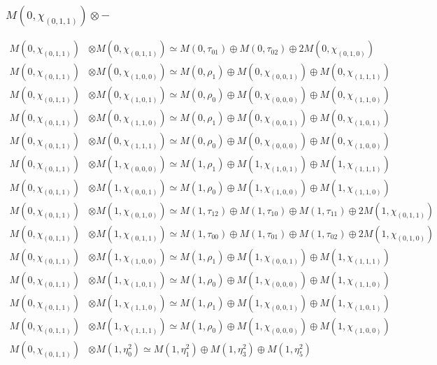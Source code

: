 \subsubsection{$ M(0,\chi_{(0,1,1)})\otimes -$}
\begin{align*}
M(0,\chi_{(0,1,1)}) &\otimes M(0,\chi_{(0,1,1)}) \simeq M(0,\tau_{01}) \oplus M(0,\tau_{02}) \oplus 2 M(0,\chi_{(0,1,0)}) \\
M(0,\chi_{(0,1,1)}) &\otimes M(0,\chi_{(1,0,0)}) \simeq M(0,\rho_{1}) \oplus M(0,\chi_{(0,0,1)}) \oplus M(0,\chi_{(1,1,1)}) \\
M(0,\chi_{(0,1,1)}) &\otimes M(0,\chi_{(1,0,1)}) \simeq M(0,\rho_{0}) \oplus M(0,\chi_{(0,0,0)}) \oplus M(0,\chi_{(1,1,0)}) \\
M(0,\chi_{(0,1,1)}) &\otimes M(0,\chi_{(1,1,0)}) \simeq M(0,\rho_{1}) \oplus M(0,\chi_{(0,0,1)}) \oplus M(0,\chi_{(1,0,1)}) \\
M(0,\chi_{(0,1,1)}) &\otimes M(0,\chi_{(1,1,1)}) \simeq M(0,\rho_{0}) \oplus M(0,\chi_{(0,0,0)}) \oplus M(0,\chi_{(1,0,0)}) \\
M(0,\chi_{(0,1,1)}) &\otimes M(1,\chi_{(0,0,0)}) \simeq M(1,\rho_{1}) \oplus M(1,\chi_{(1,0,1)}) \oplus M(1,\chi_{(1,1,1)}) \\
M(0,\chi_{(0,1,1)}) &\otimes M(1,\chi_{(0,0,1)}) \simeq M(1,\rho_{0}) \oplus M(1,\chi_{(1,0,0)}) \oplus M(1,\chi_{(1,1,0)}) \\
M(0,\chi_{(0,1,1)}) &\otimes M(1,\chi_{(0,1,0)}) \simeq M(1,\tau_{12}) \oplus M(1,\tau_{10}) \oplus M(1,\tau_{11}) \oplus 2 M(1,\chi_{(0,1,1)}) \\
M(0,\chi_{(0,1,1)}) &\otimes M(1,\chi_{(0,1,1)}) \simeq M(1,\tau_{00}) \oplus M(1,\tau_{01}) \oplus M(1,\tau_{02}) \oplus 2 M(1,\chi_{(0,1,0)}) \\
M(0,\chi_{(0,1,1)}) &\otimes M(1,\chi_{(1,0,0)}) \simeq M(1,\rho_{1}) \oplus M(1,\chi_{(0,0,1)}) \oplus M(1,\chi_{(1,1,1)}) \\
M(0,\chi_{(0,1,1)}) &\otimes M(1,\chi_{(1,0,1)}) \simeq M(1,\rho_{0}) \oplus M(1,\chi_{(0,0,0)}) \oplus M(1,\chi_{(1,1,0)}) \\
M(0,\chi_{(0,1,1)}) &\otimes M(1,\chi_{(1,1,0)}) \simeq M(1,\rho_{1}) \oplus M(1,\chi_{(0,0,1)}) \oplus M(1,\chi_{(1,0,1)}) \\
M(0,\chi_{(0,1,1)}) &\otimes M(1,\chi_{(1,1,1)}) \simeq M(1,\rho_{0}) \oplus M(1,\chi_{(0,0,0)}) \oplus M(1,\chi_{(1,0,0)}) \\
M(0,\chi_{(0,1,1)}) &\otimes M(1,\eta^{2}_{0}) \simeq M(1,\eta^{2}_{1}) \oplus M(1,\eta^{2}_{3}) \oplus M(1,\eta^{2}_{5}) \\

\end{align*}
